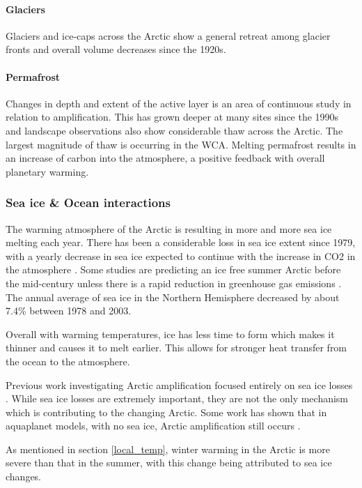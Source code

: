 \documentclass[12pt, oneside]{article}
\begin{document}
\paragraph{Glaciers}
Glaciers and ice-caps across the Arctic show a general retreat among glacier fronts and overall volume decreases since the 1920s.

\paragraph{Permafrost}
Changes in depth and extent of the active layer is an area of continuous study in relation to amplification. This has grown deeper at many sites since the 1990s and landscape observations also show considerable thaw across the Arctic. The largest magnitude of thaw is occurring in the WCA. Melting permafrost results in an increase of carbon into the atmosphere, a positive feedback with overall planetary warming.  


\subsubsection{Sea ice \& Ocean interactions}
The warming atmosphere of the Arctic is resulting in more and more sea ice melting each year. There has been a considerable loss in sea ice extent since 1979, with a yearly decrease in sea ice expected to continue with the increase in CO2 in the atmosphere \cite{dai2019arctic}. Some studies are predicting an ice free summer Arctic before the mid-century unless there is a rapid reduction in greenhouse gas emissions \cite{notz2018trajectory}. The annual average of sea ice in the Northern Hemisphere decreased by about 7.4\% between 1978 and 2003. 


Overall with warming temperatures, ice has less time to form which makes it thinner and causes it to melt earlier. This allows for stronger heat transfer from the ocean to the atmosphere. 


Previous work investigating Arctic amplification focused entirely on sea ice losses \cite{serreze2009emergence}. While sea ice losses are extremely important, they are not the only mechanism which is contributing to the changing Arctic.  Some work has shown that in aquaplanet models, with no sea ice, Arctic amplification still occurs \cite{russotto2020polar}.

As mentioned in section \ref{local_temp}, winter warming in the Arctic is more severe than that in the summer, with this change being attributed to sea ice changes.
\end{document}

